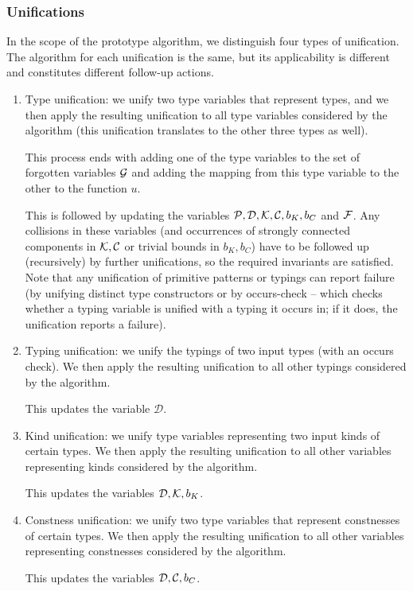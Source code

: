 \subsubsection{Unifications}
\label{unifications}

In the scope of the prototype algorithm, we distinguish four types of unification. The algorithm for each unification is the same, but its applicability is different and constitutes different follow-up actions.

\begin{enumerate}
    \item Type unification: we unify two type variables that represent types, and we then apply the resulting unification to all type variables considered by the algorithm (this unification translates to the other three types as well). \label{tUni}

    This process ends with adding one of the type variables to the set of forgotten variables $\mathcal G$ and adding the mapping from this type variable to the other to the function $u$.

    This is followed by updating the variables $\mathcal P, \mathcal D, \mathcal K, \mathcal C, b_K, b_C$ and $\mathcal F$. Any collisions in these variables (and occurrences of strongly connected components in $\mathcal K, \mathcal C$ or trivial bounds in $b_K, b_C$) have to be followed up (recursively) by further unifications, so the required invariants are satisfied. Note that any unification of primitive patterns or typings can report failure (by unifying distinct type constructors or by occurs-check -- which checks whether a typing variable is unified with a typing it occurs in; if it does, the unification reports a failure).

    \item Typing unification: we unify the typings of two input types (with an occurs check). We then apply the resulting unification to all other typings considered by the algorithm. \label{tyUni}

    This updates the variable $\mathcal D$.

    \item Kind unification: we unify type variables representing two input kinds of certain types. We then apply the resulting unification to all other variables representing kinds considered by the algorithm. \label{kUni}

    This updates the variables $\mathcal D, \mathcal K, b_K$.

    \item Constness unification: we unify two type variables that represent constnesses of certain types. We then apply the resulting unification to all other variables representing constnesses considered by the algorithm. \label{cUni}

    This updates the variables $\mathcal D, \mathcal C, b_C$.
\end{enumerate}

